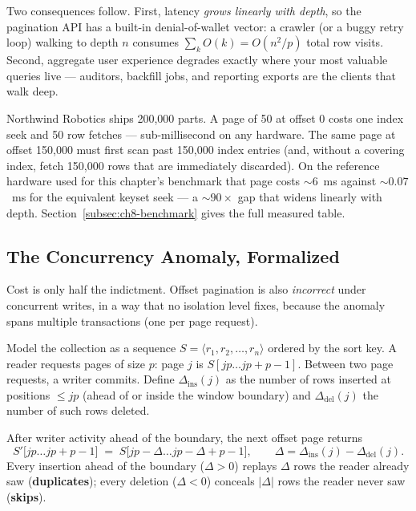 Two consequences follow. First, latency \emph{grows linearly with depth}, so
the pagination API has a built-in denial-of-wallet vector: a crawler (or a
buggy retry loop) walking to depth $n$ consumes
$\sum_{k} O(k) = O(n^2 / p)$ total row visits. Second, aggregate user
experience degrades exactly where your most valuable queries live ---
auditors, backfill jobs, and reporting exports are the clients that walk
deep.

\begin{examplebox}
Northwind Robotics ships 200{,}000 parts. A page of 50 at offset 0 costs one
index seek and 50 row fetches --- sub-millisecond on any hardware. The same
page at offset 150{,}000 must first scan past 150{,}000 index entries (and,
without a covering index, fetch 150{,}000 rows that are immediately
discarded). On the reference hardware used for this chapter's benchmark that
page costs ${\sim}6$~ms against ${\sim}0.07$~ms for the equivalent keyset
seek --- a ${\sim}90\times$ gap that widens linearly with depth.
Section~\ref{subsec:ch8-benchmark} gives the full measured table.
\end{examplebox}

\subsection{The Concurrency Anomaly, Formalized}
\label{subsec:ch8-anomaly-theory}

Cost is only half the indictment. Offset pagination is also \emph{incorrect}
under concurrent writes, in a way that no isolation level fixes, because the
anomaly spans multiple transactions (one per page request).

Model the collection as a sequence $S = \langle r_1, r_2, \ldots, r_n
\rangle$ ordered by the sort key. A reader requests pages of size $p$:
page $j$ is $S[jp \ldots jp{+}p{-}1]$. Between two page requests, a writer
commits. Define $\Delta_{\mathrm{ins}}(j)$ as the number of rows inserted
at positions $\le jp$ (ahead of or inside the window boundary) and
$\Delta_{\mathrm{del}}(j)$ the number of such rows deleted.

\begin{definition}
After writer activity ahead of the boundary, the next offset page returns
\[
S'\big[jp \ldots jp{+}p{-}1\big]
\;=\;
S\big[jp - \Delta \ldots jp - \Delta + p - 1\big],
\qquad \Delta = \Delta_{\mathrm{ins}}(j) - \Delta_{\mathrm{del}}(j).
\]
Every insertion ahead of the boundary ($\Delta > 0$) replays $\Delta$ rows
the reader already saw (\textbf{duplicates}); every deletion ($\Delta < 0$)
conceals $|\Delta|$ rows the reader never saw (\textbf{skips}).
\end{definition}

